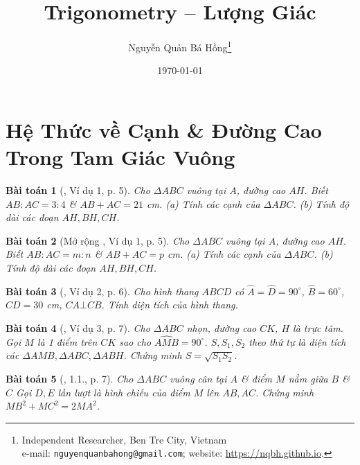 \documentclass{article}
\title{Trigonometry -- Lượng Giác}
\author{Nguyễn Quản Bá Hồng\footnote{Independent Researcher, Ben Tre City, Vietnam\\e-mail: \texttt{nguyenquanbahong@gmail.com}; website: \url{https://nqbh.github.io}.}}
\date{\today}
\newtheorem{baitoan}{Bài toán}
\begin{document}
\maketitle
\begin{abstract}
	
\end{abstract}
\tableofcontents


\section{Hệ Thức về Cạnh \& Đường Cao Trong Tam Giác Vuông}

\begin{baitoan}[\cite{TLCT_THCS_Toan_9_hinh_hoc}, Ví dụ 1, p. 5]
	Cho $\Delta ABC$ vuông tại $A$, đường cao $AH$. Biết $AB:AC = 3:4$ \& $AB + AC = 21$ \emph{cm}. (a) Tính các cạnh của $\Delta ABC$. (b) Tính độ dài các đoạn $AH,BH,CH$.
\end{baitoan}

\begin{baitoan}[Mở rộng \cite{TLCT_THCS_Toan_9_hinh_hoc}, Ví dụ 1, p. 5]
	Cho $\Delta ABC$ vuông tại $A$, đường cao $AH$. Biết $AB:AC = m:n$ \& $AB + AC = p$ \emph{cm}. (a) Tính các cạnh của $\Delta ABC$. (b) Tính độ dài các đoạn $AH,BH,CH$.
\end{baitoan}

\begin{baitoan}[\cite{TLCT_THCS_Toan_9_hinh_hoc}, Ví dụ 2, p. 6]
	Cho hình thang $ABCD$ có $\widehat{A} = \widehat{D} = 90^\circ$, $\widehat{B} = 60^\circ$, $CD = 30$ \emph{cm}, $CA\bot CB$. Tính diện tích của hình thang.
\end{baitoan}

\begin{baitoan}[\cite{TLCT_THCS_Toan_9_hinh_hoc}, Ví dụ 3, p. 7]
	Cho $\Delta ABC$ nhọn, đường cao $CK$, $H$ là trực tâm. Gọi $M$ là 1 điểm trên $CK$ sao cho $\widehat{AMB} = 90^\circ$. $S,S_1,S_2$ theo thứ tự là diện tích các $\Delta AMB,\Delta ABC,\Delta ABH$. Chứng minh $S = \sqrt{S_1S_2}$.
\end{baitoan}

\begin{baitoan}[\cite{TLCT_THCS_Toan_9_hinh_hoc}, 1.1., p. 7]
	Cho $\Delta ABC$ vuông cân tại $A$ \& điểm $M$ nằm giữa $B$ \& $C$ Gọi $D,E$ lần lượt là hình chiếu của điểm $M$ lên $AB,AC$. Chứng minh $MB^2 + MC^2 = 2MA^2$.
\end{baitoan}
\end{document}
